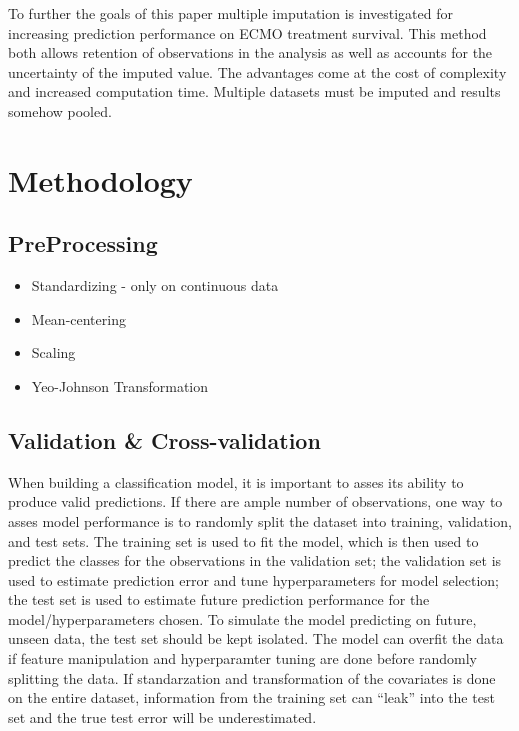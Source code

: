 \documentclass[12pt,]{article}
\providecommand{\tightlist}{%
  \setlength{\itemsep}{0pt}\setlength{\parskip}{0pt}}
\begin{document}
To further the goals of this paper multiple imputation is investigated
for increasing prediction performance on ECMO treatment survival. This
method both allows retention of observations in the analysis as well as
accounts for the uncertainty of the imputed value. The advantages come
at the cost of complexity and increased computation time. Multiple
datasets must be imputed and results somehow pooled.

\newpage

\section{Methodology}\label{methodology}

\subsection{PreProcessing}\label{preprocessing}

\begin{itemize}
\tightlist
\item
  Standardizing - only on continuous data
\item
  Mean-centering
\item
  Scaling
\item
  Yeo-Johnson Transformation
\end{itemize}

\subsection{Validation \&
Cross-validation}\label{validation-cross-validation}

When building a classification model, it is important to asses its
ability to produce valid predictions. If there are ample number of
observations, one way to asses model performance is to randomly split
the dataset into training, validation, and test sets. The training set
is used to fit the model, which is then used to predict the classes for
the observations in the validation set; the validation set is used to
estimate prediction error and tune hyperparameters for model selection;
the test set is used to estimate future prediction performance for the
model/hyperparameters chosen. To simulate the model predicting on
future, unseen data, the test set should be kept isolated. The model can
overfit the data if feature manipulation and hyperparamter tuning are
done before randomly splitting the data. If standarzation and
transformation of the covariates is done on the entire dataset,
information from the training set can ``leak'' into the test set and the
true test error will be underestimated.
\end{document}
